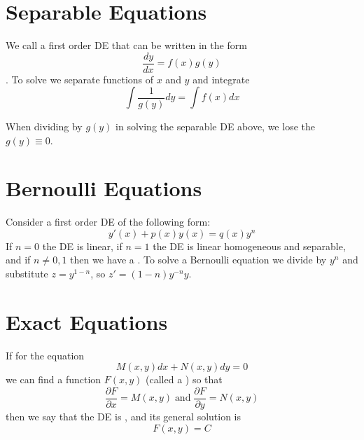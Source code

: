 \documentclass[12pt, a4paper, oneside, openright, titlepage]{book}
\begin{document}

\section{Separable Equations}

\begin{defn}
        We call a first order DE that can be written in the form \begin{equation}
                \frac{dy}{dx}=f(x)g(y)
        \end{equation}
        . To solve we separate functions of $x$ and $y$ and integrate \begin{equation}
                \int\frac{1}{g(y)}dy = \int f(x)dx
        \end{equation}
\end{defn}




\begin{defn}
        When dividing by $g(y)$ in solving the separable DE above, we lose the  $g(y) \equiv 0$.
\end{defn}



\section{Bernoulli Equations}

\begin{defn}
        Consider a first order DE of the following form: \begin{equation}
                y'(x) + p(x)y(x) = q(x)y^n
        \end{equation}
        If $n = 0$ the DE is linear, if $n = 1$ the DE is linear homogeneous and separable, and if $n \neq 0, 1$ then we have a . To solve a Bernoulli equation we divide by $y^{n}$ and substitute $z = y^{1-n}$, so $z' =(1-n)y^{-n}y
        $.
\end{defn}



\section{Exact Equations}


\begin{defn}
        If for the equation \begin{equation}
                M(x,y)dx + N(x,y)dy = 0
        \end{equation}
        we can find a function $F(x,y)$ (called a ) so that \begin{equation}
                \frac{\partial F}{\partial x} = M(x,y)\;\text{and}\;\frac{\partial F}{\partial y} = N(x,y)
        \end{equation}
        then we say that the DE is , and its general solution is \begin{equation}
                F(x,y) = C
        \end{equation}
\end{defn}
\end{document}
